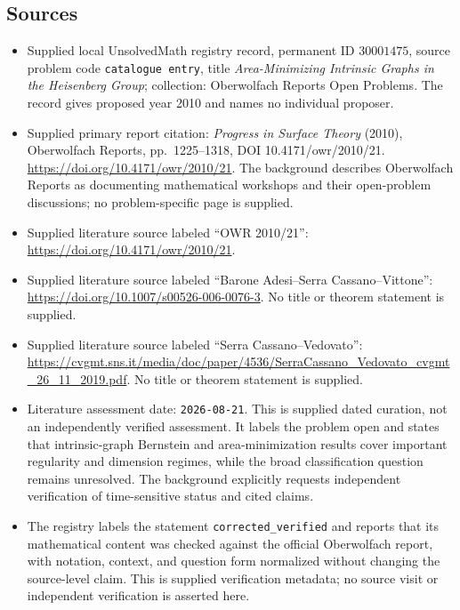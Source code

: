 \documentclass[11pt]{article}
\begin{document}
\subsection{Sources}
\begin{itemize}
\item Supplied local UnsolvedMath registry record, permanent ID \(30001475\), source problem code \texttt{catalogue entry}, title \emph{Area-Minimizing Intrinsic Graphs in the Heisenberg Group}; collection: Oberwolfach Reports Open Problems. The record gives proposed year 2010 and names no individual proposer.
\item Supplied primary report citation: \emph{Progress in Surface Theory} (2010), Oberwolfach Reports, pp.\ 1225--1318, DOI 10.4171/owr/2010/21. \url{https://doi.org/10.4171/owr/2010/21}. The background describes Oberwolfach Reports as documenting mathematical workshops and their open-problem discussions; no problem-specific page is supplied.
\item Supplied literature source labeled ``OWR 2010/21'': \url{https://doi.org/10.4171/owr/2010/21}.
\item Supplied literature source labeled ``Barone Adesi--Serra Cassano--Vittone'': \url{https://doi.org/10.1007/s00526-006-0076-3}. No title or theorem statement is supplied.
\item Supplied literature source labeled ``Serra Cassano--Vedovato'': \url{https://cvgmt.sns.it/media/doc/paper/4536/SerraCassano_Vedovato_cvgmt_26_11_2019.pdf}. No title or theorem statement is supplied.
\item Literature assessment date: \texttt{2026-08-21}. This is supplied dated curation, not an independently verified assessment. It labels the problem open and states that intrinsic-graph Bernstein and area-minimization results cover important regularity and dimension regimes, while the broad classification question remains unresolved. The background explicitly requests independent verification of time-sensitive status and cited claims.
\item The registry labels the statement \texttt{corrected\_verified} and reports that its mathematical content was checked against the official Oberwolfach report, with notation, context, and question form normalized without changing the source-level claim. This is supplied verification metadata; no source visit or independent verification is asserted here.
\end{itemize}
\end{document}
